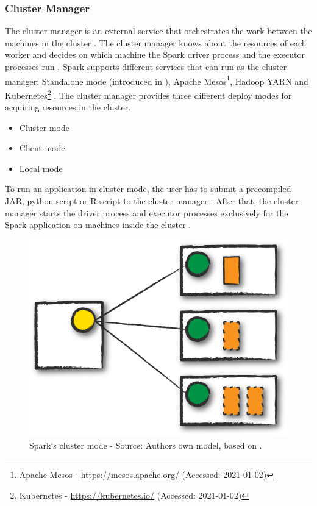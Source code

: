 \subsubsection{Cluster Manager}
\label{subsubsec:04_spark_architecture_manager}
The cluster manager is an external service that orchestrates the work between the machines in the cluster \cite{Hien2018Spark, Apache2020Spark}. The cluster manager knows about the resources of each worker and decides on which machine the Spark driver process and the executor processes run \cite{Hien2018Spark, Chambers2018Spark}.
Spark supports different services that can run as the cluster manager: Standalone mode (introduced in ), Apache Mesos\footnote{Apache Mesos - \url{https://mesos.apache.org/} (Accessed: 2021-01-02)}, Hadoop YARN\cite{Murthy2013Yarn} and Kubernetes\footnote{Kubernetes - \url{https://kubernetes.io/} (Accessed: 2021-01-02)} \cite{Apache2020Spark}.
The cluster manager provides three different deploy modes for acquiring resources in the cluster.
\begin{itemize}
\item Cluster mode
\item Client mode
\item Local mode
\end{itemize}

To run an application in cluster mode, the user has to submit a precompiled JAR, python script or R script to the cluster manager \cite{Chambers2018Spark}. After that, the cluster manager starts the driver process and executor processes exclusively for the Spark application on machines inside the cluster \cite{Chambers2018Spark, Hien2018Spark}.
\begin{figure}[h]
\centering
\includegraphics[scale=0.5]{images/04_technical_background/cluster_mode}
\caption{Spark`s cluster mode - Source: Authors own model, based on \cite{Chambers2018Spark}.}
\label{fig:spark_cluster_mode}
\end{figure}

